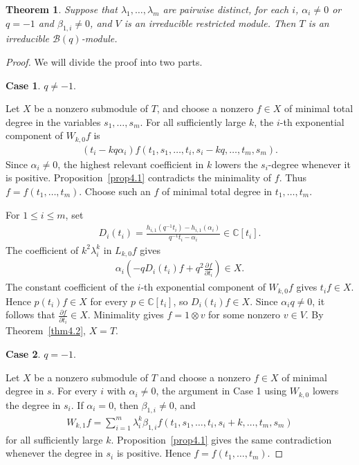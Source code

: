 \documentclass[a4paper]{amsart}
\numberwithin{equation}{section}
\newtheorem{theorem}{Theorem}[section]
\begin{document}
\begin{theorem}\label{thm4.3}
    Suppose that $\lambda_{1},\ldots,\lambda_{m}$ are pairwise distinct, for each $i$, $\alpha_{i}\neq 0$ or $q=-1$ and $\beta_{1,i}\neq0$, and $V$ is an irreducible restricted module. Then $T$ is an irreducible $\mathcal{B}(q)$-module.
\end{theorem}
\begin{proof}
  We will divide the proof into two parts.

  {\bf Case 1}.  $q\neq -1$.

  Let $X$ be a nonzero submodule of $T$, and choose a nonzero $f\in X$ of minimal total degree in the variables $s_1,\ldots,s_m$. For all sufficiently large $k$, the $i$-th exponential component of $W_{k,0}f$ is
\begin{align*}
(t_i-kq\alpha_i)
f(t_1,s_1,\ldots,t_i,s_i-kq,\ldots,t_m,s_m).
\end{align*}
Since $\alpha_i\neq0$, the highest relevant coefficient in $k$ lowers the $s_i$-degree whenever it is positive. Proposition~\ref{prop4.1} contradicts the minimality of $f$. Thus $f=f(t_1,\ldots,t_m)$. Choose such an $f$ of minimal total degree in $t_1,\ldots,t_m$.

For $1\leq i\leq m$, set
\begin{align*}
D_i(t_i)=\frac{h_{i,1}(q^{-1}t_i)-h_{i,1}(\alpha_i)}
{q^{-1}t_i-\alpha_i}\in\mathbb C[t_i].
\end{align*}
The coefficient of $k^2\lambda_i^k$ in $L_{k,0}f$ gives
\begin{align*}
\alpha_i\left(-qD_i(t_i)f+q^2\frac{\partial f}{\partial t_i}\right)\in X.
\end{align*}
The constant coefficient of the $i$-th exponential component of $W_{k,0}f$ gives $t_if\in X$. Hence $p(t_i)f\in X$ for every $p\in\mathbb C[t_i]$, so $D_i(t_i)f\in X$. Since $\alpha_iq\neq0$, it follows that $\frac{\partial f}{\partial t_i}\in X$. Minimality gives $f=1\otimes v$ for some nonzero $v\in V$. By Theorem~\ref{thm4.2}, $X=T$.

{\bf Case 2}. $q= -1$.

Let $X$ be a nonzero submodule of $T$ and choose a nonzero $f\in X$ of minimal degree in $s$. For every $i$ with $\alpha_i\neq0$, the argument in Case 1 using $W_{k,0}$ lowers the degree in $s_i$. If $\alpha_i=0$, then $\beta_{1,i}\neq0$, and
\begin{align*}
W_{k,1}f=\sum_{i=1}^m\lambda_i^k\beta_{1,i}
f(t_1,s_1,\ldots,t_i,s_i+k,\ldots,t_m,s_m)
\end{align*}
for all sufficiently large $k$. Proposition~\ref{prop4.1} gives the same contradiction whenever the degree in $s_i$ is positive. Hence $f=f(t_1,\ldots,t_m)$.


\end{proof}
\end{document}
